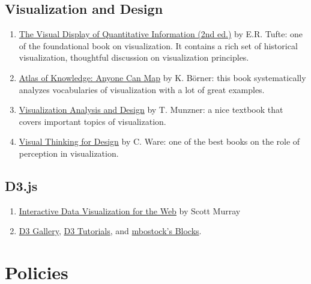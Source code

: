 \documentclass[11pt,article,oneside]{memoir} %
\begin{document}
\subsection{Visualization and Design}%

\begin{enumerate}%

\item \href{http://www.amazon.com/gp/product/0961392142}{The Visual Display of Quantitative Information (2nd ed.)} by E.R. Tufte: one of the foundational book on visualization. It contains a rich set of historical visualization, thoughtful discussion on visualization principles. 

\item \href{http://www.amazon.com/Atlas-Knowledge-Anyone-Can-Map/dp/0262028816}{Atlas of Knowledge: Anyone Can Map} by K. Börner: this book systematically analyzes vocabularies of visualization with a lot of great examples. 

\item \href{http://www.amazon.com/Visualization-Analysis-Design-AK-Peters/dp/1466508914}{Visualization Analysis and Design} by T. Munzner: a nice textbook that covers important topics of visualization. 

\item \href{http://www.amazon.com/Visual-Thinking-Kaufmann-Interactive-Technologies/dp/0123708966}{Visual Thinking for Design} by C. Ware: one of the best books on the role of perception in visualization. 

\end{enumerate}%
\subsection{D3.js}%

\begin{enumerate}%

\item \href{http://www.amazon.com/Interactive-Data-Visualization-Scott-Murray/dp/1449339735}{Interactive Data Visualization for the Web} by Scott Murray

\item \href{https://github.com/d3/d3/wiki/Gallery}{D3 Gallery}, \href{https://github.com/d3/d3/wiki/tutorials}{D3 Tutorials}, and \href{https://bl.ocks.org/mbostock}{mbostock's Blocks}. 

\end{enumerate}%

\section{Policies}%
\end{document}
